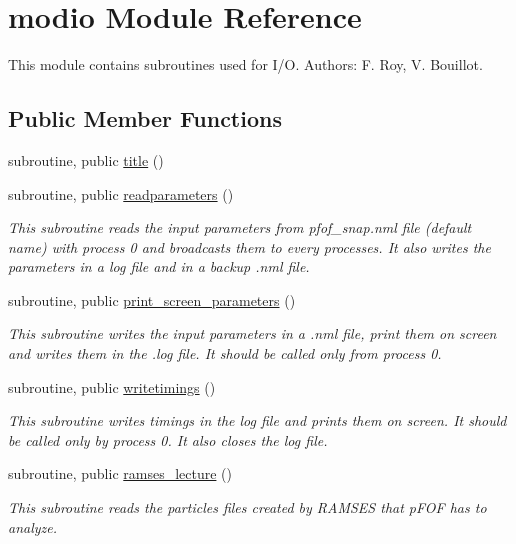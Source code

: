 \hypertarget{classmodio}{\section{modio Module Reference}
\label{classmodio}
}


This module contains subroutines used for I/\-O. Authors\-: F. Roy, V. Bouillot.  


\subsection*{Public Member Functions}
\begin{DoxyCompactItemize}
\item 
subroutine, public \hyperlink{classmodio_a90c33edbc534da99fc29b95e36133d18}{title} ()
\item 
subroutine, public \hyperlink{classmodio_add45280540db1513b0ec12d80d94481d}{readparameters} ()
\begin{DoxyCompactList}\small\item\em This subroutine reads the input parameters from pfof\-\_\-snap.\-nml file (default name) with process 0 and broadcasts them to every processes. It also writes the parameters in a log file and in a backup .nml file. \end{DoxyCompactList}\item 
subroutine, public \hyperlink{classmodio_a8a43ba0374a36e27ff444cb286703135}{print\-\_\-screen\-\_\-parameters} ()
\begin{DoxyCompactList}\small\item\em This subroutine writes the input parameters in a .nml file, print them on screen and writes them in the .log file. It should be called only from process 0. \end{DoxyCompactList}\item 
subroutine, public \hyperlink{classmodio_a4ae2c63c80099d6d657525db263669b4}{writetimings} ()
\begin{DoxyCompactList}\small\item\em This subroutine writes timings in the log file and prints them on screen. It should be called only by process 0. It also closes the log file. \end{DoxyCompactList}\item 
subroutine, public \hyperlink{classmodio_ace8fcccb287d2dd5f356ec1ef317aa61}{ramses\-\_\-lecture} ()
\begin{DoxyCompactList}\small\item\em This subroutine reads the particles files created by R\-A\-M\-S\-E\-S that p\-F\-O\-F has to analyze. \end{DoxyCompactList}\item 

\end{DoxyCompactItemize}

